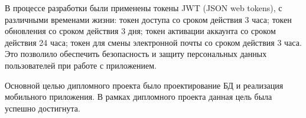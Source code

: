 
В процессе разработки были применены токены JWT (JSON web tokens), с различными временами жизни:
токен доступа со сроком действия 3 часа;
токен обновления со сроком действия 3 дня;
токен активации аккаунта со сроком действия 24 часа;
токен для смены электронной почты со сроком действия 3 часа.
Это позволило обеспечить безопасность и защиту персональных данных пользователей при работе с приложением.

Основной целью дипломного проекта было проектирование БД и реализация мобильного приложения.
В рамках дипломного проекта данная цель была успешно достигнута.
